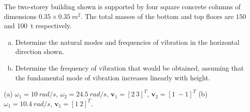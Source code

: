 
\begin{Exercise}[label={two_storey}]
The two-storey building shown is supported by four square concrete columns of dimensions $0.35 \times \SI{0.35}{m^2}$. The total masses of the bottom and top floors are $150$ and \SI{100}{t} respectively.
\begin{enumerate}[(a)]
    \item Determine the natural modes and frequencies of vibration in the horizontal direction shown.
    \item Determine the frequency of vibration that would be obtained, assuming that the fundamental mode of vibration increases linearly with height.
\end{enumerate}

\begin{center}
\end{center}

\shortAnswer (a) $\omega_1=\SI{10}{rad/s}$, $\omega_2=\SI{24.5}{rad/s}$, $\mathbf{v}_1 = [2\ 3]^T$, $\mathbf{v}_2 = [1\ {-}1]^T$
(b) $\omega_1=\SI{10.4}{rad/s}$, $\mathbf{v}_1 = [1\ 2]^T$.
\end{Exercise}



